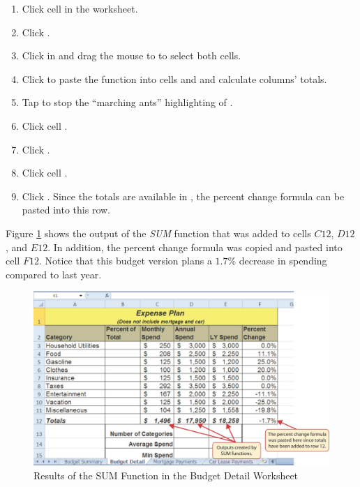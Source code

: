 \begin{enumbox}
	\begin{enumerate}
		\item Click cell  in the  worksheet.
		\item Click .
		\item Click in  and drag the mouse to  to select both cells.
		\item Click  to paste the  function into cells  and  and calculate columns' totals.
		\item Tap  to stop the ``marching ants'' highlighting of .
		\item Click cell .
		\item Click .
		\item Click cell .
		\item Click . Since the totals are available in , the percent change formula can be pasted into this row.
	\end{enumerate}
\end{enumbox}

Figure \ref{02:fig12} shows the output of the \textit{SUM} function that was added to cells $ C12 $, $ D12 $, and $ E12 $. In addition, the percent change formula was copied and pasted into cell $ F12 $. Notice that this budget version plans a $ 1.7 $\% decrease in spending compared to last year.

\begin{figure}[H]
	\centering
	\includegraphics[width=\maxwidth{.95\linewidth}]{gfx/ch02_fig12}
	\caption{Results of the SUM Function in the Budget Detail Worksheet}
	\label{02:fig12}
\end{figure}

